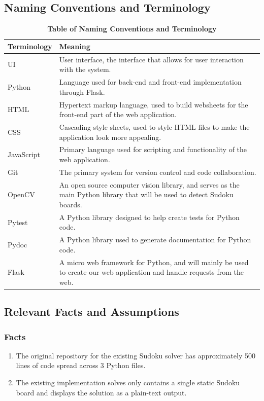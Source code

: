 \documentclass[11pt]{article}
\begin{document}
\subsection{Naming Conventions and Terminology}
\begin{table}[H]
\caption{\bf Table of Naming Conventions and Terminology}
\centering
\begin{tabularx}{\textwidth}{p{3cm}X}
\toprule
Terminology     & Meaning \\
\midrule
UI     & User interface, the interface that allows for user interaction with the system. \\
Python & Language used for back-end and front-end implementation through Flask.\\
HTML & Hypertext markup language, used to build websheets for the front-end part of the web application.\\
CSS & Cascading style sheets, used to style HTML files to make the application look more appealing.\\
JavaScript & Primary language used for scripting and functionality of the web application. \\
Git & The primary system for version control and code collaboration.\\
OpenCV & An open source computer vision library, and serves as the main Python library that will be used to detect Sudoku boards. \\
Pytest & A Python library designed to help create tests for Python code. \\
Pydoc & A Python library used to generate documentation for Python code. \\
Flask & A micro web framework for Python, and will mainly be used to create our web application and handle requests from the web.\\
\bottomrule
\end{tabularx}
\end{table}
\subsection{Relevant Facts and Assumptions}

\subsubsection{Facts}

\begin{enumerate}
    \item The original repository for the existing Sudoku solver has approximately 500 lines of code spread across 3 Python files.
    \item The existing implementation solves only contains a single static Sudoku board and displays the solution as a plain-text output.
\end{enumerate}
\end{document}
